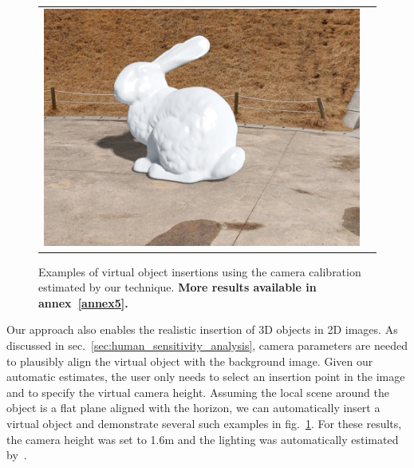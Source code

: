 \begin{figure}
\begin{tabular}{@{}cc@{}}
\includegraphics[width=\voiwidth\linewidth]{figures/applications/virtual_object_insertions/pano_abpebgbgmpccye_jpg-6_5_es.png}
\end{tabular}
\caption[Examples of virtual object insertion]{Examples of virtual object insertions using the camera calibration estimated by our technique. \textbf{More results available in annex~\ref{annex5}.}\vspace{-0.5em}}
\label{fig:applications_virtual_object_insertion}
\end{figure}

Our approach also enables the realistic insertion of 3D objects in 2D images. As discussed in sec.~\ref{sec:human_sensitivity_analysis}, camera parameters are needed to plausibly align the virtual object with the background image. Given our automatic estimates, the user only needs to select an insertion point in the image and to specify the virtual camera height. Assuming the local scene around the object is a flat plane aligned with the horizon, we can automatically insert a virtual object and demonstrate several such examples in fig.~\ref{fig:applications_virtual_object_insertion}. For these results, the camera height was set to 1.6m and the lighting was automatically estimated by~\cite{holdgeoffroy-cvpr-17,gardner-sigasia-17}.


